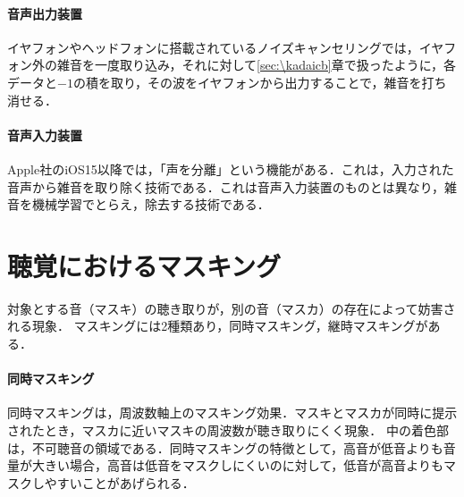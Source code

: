 \paragraph{音声出力装置}イヤフォンやヘッドフォンに搭載されているノイズキャンセリングでは，イヤフォン外の雑音を一度取り込み，それに対して\ref{sec:\kadaicb}章で扱ったように，各データと\(-1\)の積を取り，その波をイヤフォンから出力することで，雑音を打ち消せる．\par
\paragraph{音声入力装置}Apple社のiOS15以降では，「声を分離」という機能がある．これは，入力された音声から雑音を取り除く技術である．これは音声入力装置のものとは異なり，雑音を機械学習でとらえ，除去する技術である．
\section{聴覚におけるマスキング}
対象とする音（マスキ）の聴き取りが，別の音（マスカ）の存在によって妨害される現象．
マスキングには2種類あり，同時マスキング，継時マスキングがある．
\paragraph{同時マスキング}同時マスキングは，周波数軸上のマスキング効果．マスキとマスカが同時に提示されたとき，マスカに近いマスキの周波数が聴き取りにくく現象\cite{マスキングと騒音対策}．
中の着色部は，不可聴音の領域である．同時マスキングの特徴として，高音が低音よりも音量が大きい場合，高音は低音をマスクしにくいのに対して，低音が高音よりもマスクしやすいことがあげられる．
